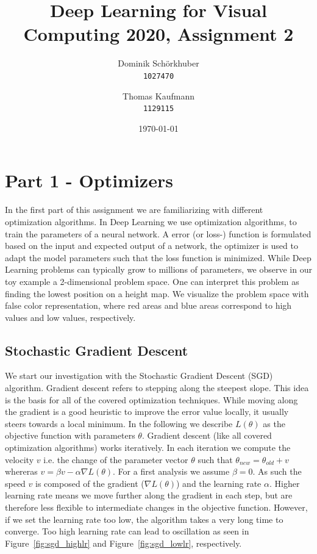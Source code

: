 \documentclass[12pt]{article}
\title{\Large\vspace{-4cm}Deep Learning for Visual Computing 2020, Assignment 2}
\author{
  Dominik Schörkhuber\\
  \texttt{1027470}
  \and
  Thomas Kaufmann\\
  \texttt{1129115}
}
\date{\today}
\begin{document}
	\maketitle

\section{Part 1 - Optimizers}
In the first part of this assignment we are familiarizing with different optimization algorithms. In Deep Learning we use optimization algorithms, to train the parameters of a neural network. A error (or loss-) function is formulated based on the input and expected output of a network, the optimizer is used to adapt the model parameters such that the loss function is minimized. While Deep Learning problems can typically grow to millions of parameters, we observe in our toy example a 2-dimensional problem space. One can interpret this problem as finding the lowest position on a height map. We visualize the problem space with false color representation, where red areas and blue areas correspond to high values and low values, respectively. 

\subsection{Stochastic Gradient Descent}
We start our investigation with the Stochastic Gradient Descent (SGD) algorithm. Gradient descent refers to stepping along the steepest slope. This idea is the basis for all of the covered optimization techniques. While moving along the gradient is a good heuristic to improve the error value locally, it usually steers towards a local minimum. In the following we describe $L(\theta)$ as the objective function with parameters $\theta$. Gradient descent (like all covered optimization algorithms) works iteratively. In each iteration we compute the velocity $v$ i.e. the change of the parameter vector $\theta$ such that $\theta_{new} = \theta_{old} + v$ whereras $v = \beta v - \alpha \nabla L(\theta)$. For a first analysis we assume $\beta = 0$. As such the speed $v$ is composed of the gradient ($\nabla L(\theta)$) and the learning rate $\alpha$. Higher learning rate means we move further along the gradient in each step, but are therefore less flexible to intermediate changes in the objective function. However, if we set the learning rate too low, the algorithm takes a very long time to converge. Too high learning rate can lead to oscillation as seen in Figure~\ref{fig:sgd_highlr} and Figure~\ref{fig:sgd_lowlr}, respectively.
\end{document}

